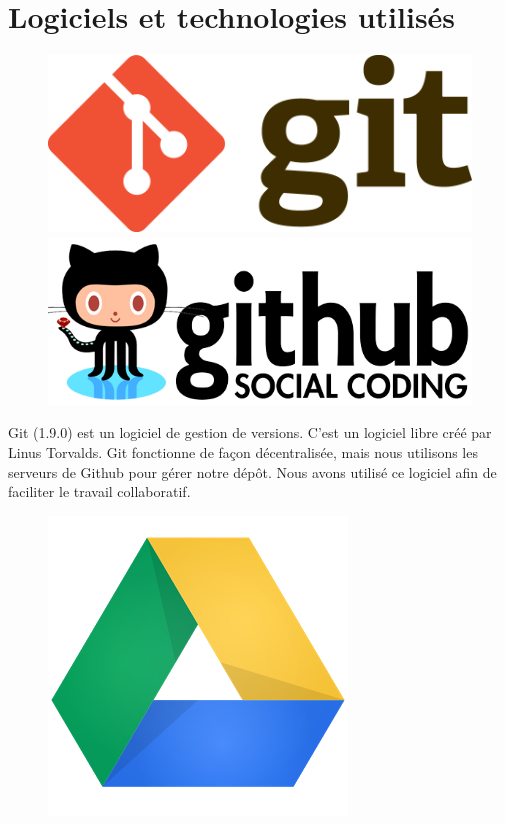 \documentclass[16pts]{report}
\begin{document}
    \section{Logiciels et technologies utilisés}
    \label{sec:Logiciels et technologies utilisés}


\begin{figure}[H]
    \includegraphics[scale=0.3]{illustrations/git.png}
    \includegraphics[scale=0.15]{illustrations/github.png}
    \centering
\end{figure}

Git (1.9.0) est un logiciel de gestion de versions.  C'est un logiciel libre
créé par Linus Torvalds.  Git fonctionne de façon décentralisée, mais nous
utilisons les serveurs de Github pour gérer notre dépôt.  Nous avons utilisé ce
logiciel afin de faciliter le travail collaboratif. \\

\begin{figure}[H]
    \includegraphics[scale=0.15]{illustrations/GoogleDrive.png}
    \centering
\end{figure}
\end{document}
